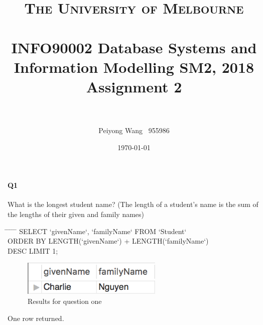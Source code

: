 \documentclass[paper=a4, fontsize=11pt]{scrartcl} %
\title{	
    \normalfont \normalsize 
    \textsc{The University of Melbourne } \\ [25pt] %
    \horrule{0.5pt} \\[0.05cm] %
    \huge INFO90002 Database Systems and Information Modelling SM2, 2018
    Assignment 2 \\ %
    \horrule{1pt} \\[0.1cm] %
    }
\author{Peiyong Wang $\,$ 955986} %
\date{\normalsize\today} %
\numberwithin{equation}{section} %
\numberwithin{figure}{section} %
\numberwithin{table}{section} %
\begin{document}
 

    \maketitle %
    \thispagestyle{empty}
    
    \section{ }
    \paragraph{Q1}What is the longest student name? (The length of a student’s name is the sum of the lengths of their given and family names)
    \begin{center}
        \begin{minipage}{10cm}
        \begin{tabbing}
            \hspace*{.25in} \= \hspace*{.25in} \= \hspace*{.25in} \= \hspace*{.25in} \= \hspace*{.25in} \=\kill
            {\color{blue}SELECT `givenName`, `familyName` FROM `Student`}\\
            \> {\color{blue}ORDER BY LENGTH(`givenName`) + LENGTH(`familyName`)} \\
            \> {\color{blue}DESC LIMIT 1};
        
        \end{tabbing}
        \end{minipage}
    \end{center}
    
    \begin{figure}[htbp!]
    		\centering
    		\includegraphics[width=0.6\textwidth]{q11.png}
    		\caption{Results for question one}%
    		\vspace{-1em}
    \end{figure}

    {\color{red} One row returned}.

    \section{}
\end{document}

